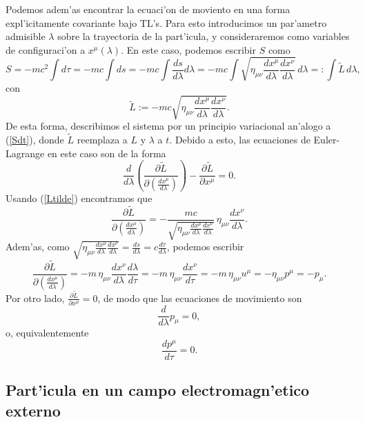 Podemos adem'as encontrar la ecuaci'on de moviento en una forma expl'icitamente
covariante bajo TL's. Para esto introducimos un par'ametro admisible $\lambda$
sobre la trayectoria de la part'icula, y consideraremos como variables de
configuraci'on a $x^\mu(\lambda)$. En este caso, podemos escribir $S$ como
\begin{equation}
S=-mc^2\int  d\tau=-mc\int  ds=-mc\int  \frac{ds}{d\lambda}d\lambda=-mc\int
\sqrt{\eta_{\mu\nu}\frac{dx^\mu}{d\lambda}\frac{dx^\nu}{d\lambda}}\,
d\lambda=:\int  \tilde{L}\,d\lambda,
\end{equation}
con
\begin{equation}
\tilde{L}:=-mc\sqrt{\eta_{\mu\nu}\frac{dx^\mu}{d\lambda}\frac{dx^\nu}{d\lambda}}
. \label{Ltilde}
\end{equation}
De esta forma, describimos el sistema por un principio variacional an'alogo a
(\ref{Sdt}), donde $\tilde{L}$ reemplaza a $L$ y $\lambda$ a $t$. Debido a esto,
las ecuaciones de Euler-Lagrange en este caso son de la forma
\begin{equation}
\frac{d}{d\lambda}\left(  \frac{\partial
\tilde{L}}{\partial\left(\frac{dx^\mu}{d\lambda}\right) }\right)-\frac{\partial
\tilde{L}}{\partial x^\mu}=0.
\end{equation}
Usando (\ref{Ltilde}) encontramos que
\begin{equation}
 \frac{\partial \tilde{L}}{\partial\left(\frac{dx^\mu}{d\lambda}\right)
}=-\frac{mc}{\sqrt{\eta_{\mu\nu}\frac{dx^\mu}{d\lambda}\frac{dx^\nu}{d\lambda}}}
\,\eta_{\mu\nu}\frac{dx^\nu}{d\lambda}.
\end{equation}
Adem'as, como
$\sqrt{\eta_{\mu\nu}\frac{dx^\mu}{d\lambda}\frac{dx^\nu}{d\lambda}}=\frac{ds}{
d\lambda}=c\frac{d\tau}{d\lambda}$,  podemos escribir
\begin{equation}
 \frac{\partial \tilde{L}}{\partial\left(\frac{dx^\mu}{d\lambda}\right)
}=-m\,\eta_{\mu\nu}\frac{dx^\nu}{d\lambda}\frac{d\lambda}{d\tau}=-m\,\eta_{
\mu\nu}\frac{dx^\nu}{d\tau}=-m\,\eta_{\mu\nu}u^\mu=-\eta_{\mu\nu}p^\mu=-p_\mu.
\end{equation}
Por otro lado, $\frac{\partial \tilde{L}}{\partial x^\mu}=0$, de modo que las
ecuaciones de movimiento son
\begin{equation}
\frac{d}{d\lambda}p_\mu=0,
\end{equation}
o, equivalentemente
\begin{equation}
\frac{dp^\mu}{d\tau}  =0.
\end{equation}

\subsection{Part'icula en un campo electromagn'etico externo}


